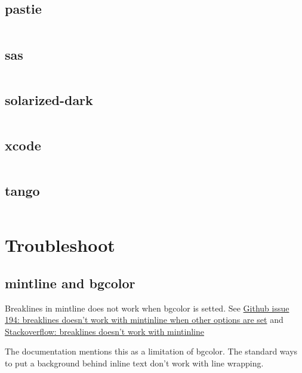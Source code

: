 \documentclass{article}
\begin{document}
\subsection{pastie}
\inputminted[bgcolor=AntiqueWhite]{c}{../code/helloworld.c}

\subsection{sas}
\inputminted[bgcolor=AntiqueWhite]{c}{../code/helloworld.c}

\subsection{solarized-dark}
\inputminted[bgcolor=AntiqueWhite]{c}{../code/helloworld.c}

\subsection{xcode}
\inputminted[bgcolor=AntiqueWhite]{c}{../code/helloworld.c}

\subsection{tango}
\inputminted[bgcolor=AntiqueWhite]{c}{../code/helloworld.c}

\section{Troubleshoot}

\subsection{mintline and bgcolor}

Breaklines in mintline does not work when bgcolor is setted. 
See 
\href{https://github.com/gpoore/minted/issues/194}{Github issue 194: breaklines doesn't work with mintinline when other options are set}
and 
\href{https://tex.stackexchange.com/questions/419934/breaklines-doesnt-work-with-mintinline}{Stackoverflow: breaklines doesn't work with mintinline}

The documentation mentions this as a limitation of bgcolor. The standard ways to put a background behind inline text don't work with line wrapping.
\end{document}
